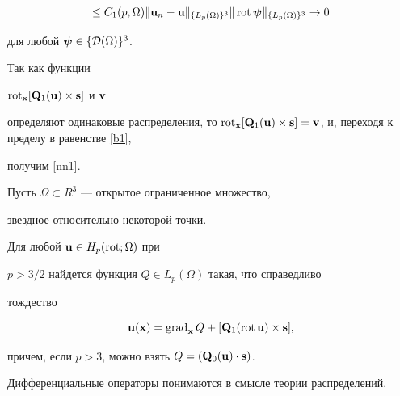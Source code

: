 \begin{pf}
\begin{multline*}
%


\leq C_1(p,\Omega)\|\bold{u}_n-\bold{u}\|_{\{L_p(\Omega)\}^3}\|\Rot


\boldsymbol{\psi}\|_{\{L_p(\Omega)\}^3}\to 0


\end{multline*}


для любой $\boldsymbol{\psi}\in\{{\cal D}(\Omega)\}^3$.


Так как функции


$\operatorname{rot}_{\bold{x}}[\bold{Q}_1(\bold{u})\times\bold{s}]$ и $\bold{v}$


определяют одинаковые распределения, то $\Rot_{\bold{x}}[\bold{Q}_1


(\bold{u})\times\bold{s}]=\bold{v}$, и, переходя к пределу в равенстве \eqref{b1},


получим \eqref{nn1}.


\end{pf}





\begin{thms}\label{n2}


Пусть $\Omega\subset R^3$ --- открытое ограниченное множество,


звездное относительно некоторой точки.


Для любой $\bold{u}\in H_p(\operatorname{rot};\Omega)$ при


${p>3/2}$ найдется функция $Q\in L_p(\Omega)$ такая, что справедливо


тождество


\begin{equation}


\bold{u}(\bold{x})=\Grad_{\bold{x}}Q+[\bold{Q}_1(\Rot


\bold{u})\times\bold{s}],


\label{nn2}


\end{equation}


причем, если $p>3$, можно взять $Q=(\bold{Q}_0(\bold{u})\cdot\bold{s})$.


Дифференциальные операторы понимаются в смысле теории распределений.


\end{thms}





